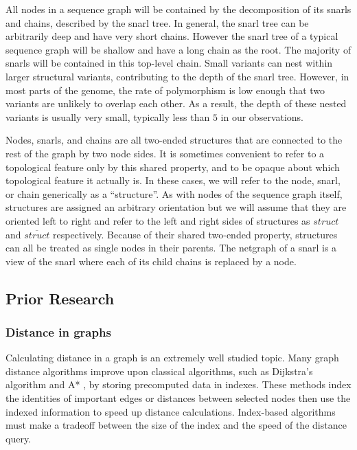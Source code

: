 \documentclass[11pt]{ucscthesis}
\begin{document}
All nodes in a sequence graph will be contained by the decomposition of its snarls and chains, described by the snarl tree.
In general, the snarl tree can be arbitrarily deep and have very short chains.
However the snarl tree of a typical sequence graph will be shallow and have a long chain as the root.
The majority of snarls will be contained in this top-level chain. Small variants can nest within larger structural variants, contributing to the depth of the snarl tree.
However, in most parts of the genome, the rate of polymorphism is low enough that two variants are unlikely to overlap each other.
As a result, the depth of these nested variants is usually very small, typically less than $5$ in our observations.

Nodes, snarls, and chains are all two-ended structures that are connected to the rest of the graph by two node sides.
It is sometimes convenient to refer to a topological feature only by this shared property, and to be opaque about which topological feature it actually is.
In these cases, we will refer to the node, snarl, or chain generically as a ``structure''.
As with nodes of the sequence graph itself, structures are assigned an arbitrary orientation but we will assume that they are oriented left to right and refer to the left and right sides of structures as $struct$ and $\overline{struct}$ respectively.
Because of their shared two-ended property, structures can all be treated as single nodes in their parents.
The netgraph of a snarl is a view of the snarl where each of its child chains is replaced by a node.



\subsection{Prior Research}

\subsubsection{Distance in graphs}

Calculating distance in a graph is an extremely well studied topic.
Many graph distance algorithms improve upon classical algorithms, such as Dijkstra's algorithm \cite{dijkstra_note_1959} and A* \cite{hart_formal_1968}, by storing precomputed data in indexes.
These methods index the identities of important edges \cite{hutchison_partitioning_2005,lauther_extremely_2004} or distances between selected nodes \cite{dave_topcom:_2015,qiao_approximate_2012,goos_efficient_1997,akiba_fast_2013-1} then use the indexed information to speed up distance calculations.
Index-based algorithms must make a tradeoff between the size of the index and the speed of the distance query.
\end{document}

